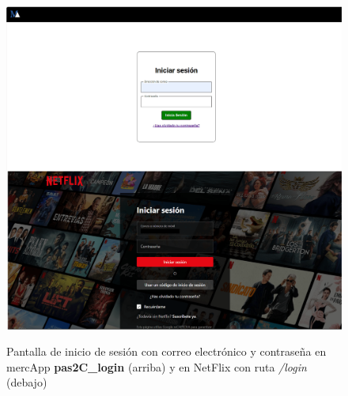 \documentclass[a4paper,12pt]{report}
\begin{document}
	\FloatBarrier
	\setlength{\belowcaptionskip}{3pt}
	\begin{figure}[H]
		\centering
		\caption{Pantalla de inicio de sesión con correo electrónico y contraseña en mercApp \textbf{pas2C\_login} (arriba) y en NetFlix con ruta \textit{/login} (debajo)}

		\includegraphics[width=1\linewidth]{img/login}
		\label{fig:login}
	\end{figure}
	\FloatBarrier
	
\end{document}
